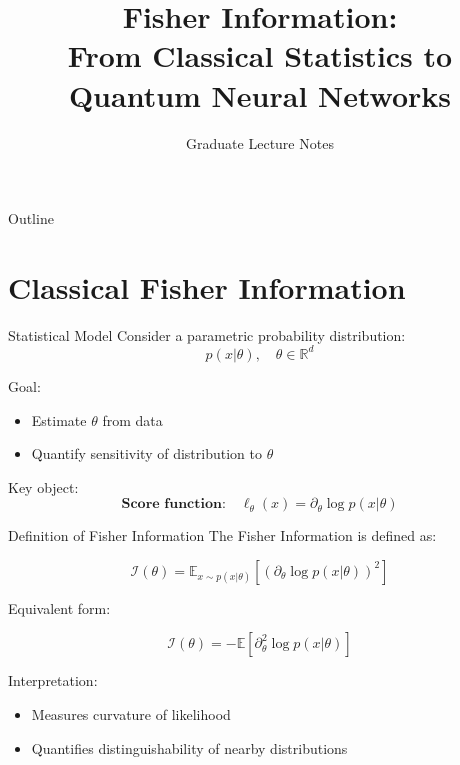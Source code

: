 \documentclass{beamer}
\title{Fisher Information:\\ From Classical Statistics to Quantum Neural Networks}
\author{Graduate Lecture Notes}
\date{}
\begin{document}
\frame{\titlepage}

\begin{frame}{Outline}
\tableofcontents
\end{frame}

\section{Classical Fisher Information}

\begin{frame}{Statistical Model}
Consider a parametric probability distribution:
\[
p(x|\theta), \quad \theta \in \mathbb{R}^d
\]

Goal:
\begin{itemize}
\item Estimate $\theta$ from data
\item Quantify sensitivity of distribution to $\theta$
\end{itemize}

\pause

Key object:
\[
\textbf{Score function:} \quad 
\ell_\theta(x) = \partial_\theta \log p(x|\theta)
\]

\end{frame}

\begin{frame}{Definition of Fisher Information}
The Fisher Information is defined as:

\[
\mathcal{I}(\theta) 
= \mathbb{E}_{x \sim p(x|\theta)} 
\left[ (\partial_\theta \log p(x|\theta))^2 \right]
\]

\pause

Equivalent form:

\[
\mathcal{I}(\theta)
= - \mathbb{E}\left[\partial_\theta^2 \log p(x|\theta)\right]
\]

\pause

Interpretation:
\begin{itemize}
\item Measures curvature of likelihood
\item Quantifies distinguishability of nearby distributions
\end{itemize}

\end{frame}
\end{document}
